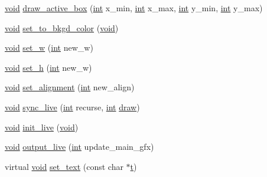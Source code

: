 \begin{DoxyCompactItemize}
\hyperlink{wglext_8h_a9e6b7f1933461ef318bb000d6bd13b83}{void} \hyperlink{class_g_l_u_i___control_aa61812303961384f999c35f128f04c93}{draw\+\_\+active\+\_\+box} (\hyperlink{wglext_8h_a500a82aecba06f4550f6849b8099ca21}{int} x\+\_\+min, \hyperlink{wglext_8h_a500a82aecba06f4550f6849b8099ca21}{int} x\+\_\+max, \hyperlink{wglext_8h_a500a82aecba06f4550f6849b8099ca21}{int} y\+\_\+min, \hyperlink{wglext_8h_a500a82aecba06f4550f6849b8099ca21}{int} y\+\_\+max)
\item 
\hyperlink{wglext_8h_a9e6b7f1933461ef318bb000d6bd13b83}{void} \hyperlink{class_g_l_u_i___control_a091c0c095827c3270b442d9bd3542d50}{set\+\_\+to\+\_\+bkgd\+\_\+color} (\hyperlink{wglext_8h_a9e6b7f1933461ef318bb000d6bd13b83}{void})
\item 
\hyperlink{wglext_8h_a9e6b7f1933461ef318bb000d6bd13b83}{void} \hyperlink{class_g_l_u_i___control_a7f9dde76de0e5fd660dc43695b40c91d}{set\+\_\+w} (\hyperlink{wglext_8h_a500a82aecba06f4550f6849b8099ca21}{int} new\+\_\+w)
\item 
\hyperlink{wglext_8h_a9e6b7f1933461ef318bb000d6bd13b83}{void} \hyperlink{class_g_l_u_i___control_acc29b79df3861b1910b2a41e0e8d2822}{set\+\_\+h} (\hyperlink{wglext_8h_a500a82aecba06f4550f6849b8099ca21}{int} new\+\_\+w)
\item 
\hyperlink{wglext_8h_a9e6b7f1933461ef318bb000d6bd13b83}{void} \hyperlink{class_g_l_u_i___control_ad853d2029a306239daa3c9af6c36730d}{set\+\_\+alignment} (\hyperlink{wglext_8h_a500a82aecba06f4550f6849b8099ca21}{int} new\+\_\+align)
\item 
\hyperlink{wglext_8h_a9e6b7f1933461ef318bb000d6bd13b83}{void} \hyperlink{class_g_l_u_i___control_a56a06a9b1272eb0a537ea01a6c002cf8}{sync\+\_\+live} (\hyperlink{wglext_8h_a500a82aecba06f4550f6849b8099ca21}{int} recurse, \hyperlink{wglext_8h_a500a82aecba06f4550f6849b8099ca21}{int} \hyperlink{class_g_l_u_i___control_a2eb42d7a7951280ad2fe8c37972bf66a}{draw})
\item 
\hyperlink{wglext_8h_a9e6b7f1933461ef318bb000d6bd13b83}{void} \hyperlink{class_g_l_u_i___control_a4d56b92f8b6454c3f64ba6f0ef5470b8}{init\+\_\+live} (\hyperlink{wglext_8h_a9e6b7f1933461ef318bb000d6bd13b83}{void})
\item 
\hyperlink{wglext_8h_a9e6b7f1933461ef318bb000d6bd13b83}{void} \hyperlink{class_g_l_u_i___control_ac7417112964d4c5134d4453835a0da99}{output\+\_\+live} (\hyperlink{wglext_8h_a500a82aecba06f4550f6849b8099ca21}{int} update\+\_\+main\+\_\+gfx)
\item 
virtual \hyperlink{wglext_8h_a9e6b7f1933461ef318bb000d6bd13b83}{void} \hyperlink{class_g_l_u_i___control_a44fab5a8af3c58865bc2cd8bfd596af8}{set\+\_\+text} (const char $\ast$\hyperlink{glext_8h_a7d65d00ca3b0630d9b5c52df855b19f5}{t})

\end{DoxyCompactItemize}
